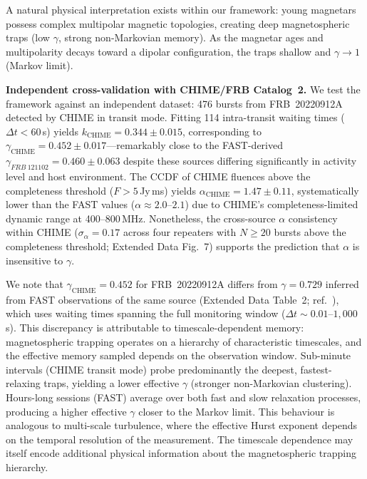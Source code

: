 \documentclass[twocolumn]{article}
\newcommand{\frb}[1]{FRB~#1}
\begin{document}
A natural physical interpretation exists within our framework: young magnetars possess complex multipolar magnetic topologies, creating deep magnetospheric traps (low $\gamma$, strong non-Markovian memory). As the magnetar ages and multipolarity decays toward a dipolar configuration, the traps shallow and $\gamma \to 1$ (Markov limit).

\textbf{Independent cross-validation with CHIME/FRB Catalog~2.} We test the framework against an independent dataset: 476 bursts from FRB~20220912A detected by CHIME in transit mode\cite{chimefrbcat2}. Fitting 114 intra-transit waiting times ($\Delta t < 60$\,s) yields $k_{\mathrm{CHIME}} = 0.344 \pm 0.015$, corresponding to $\gamma_{\mathrm{CHIME}} = 0.452 \pm 0.017$---remarkably close to the FAST-derived $\gamma_{\frb{121102}} = 0.460 \pm 0.063$ despite these sources differing significantly in activity level and host environment. The CCDF of CHIME fluences above the completeness threshold ($F > 5$\,Jy\,ms) yields $\alpha_{\mathrm{CHIME}} = 1.47 \pm 0.11$, systematically lower than the FAST values ($\alpha \approx 2.0$--$2.1$) due to CHIME's completeness-limited dynamic range at 400--800\,MHz. Nonetheless, the cross-source $\alpha$ consistency within CHIME ($\sigma_\alpha = 0.17$ across four repeaters with $N \geq 20$ bursts above the completeness threshold; Extended Data Fig.~7) supports the prediction that $\alpha$ is insensitive to $\gamma$.

We note that $\gamma_{\mathrm{CHIME}} = 0.452$ for FRB~20220912A differs from $\gamma = 0.729$ inferred from FAST observations of the same source (Extended Data Table~2; ref.~\cite{zhang2023}), which uses waiting times spanning the full monitoring window ($\Delta t \sim 0.01$--$1{,}000$\,s). This discrepancy is attributable to timescale-dependent memory: magnetospheric trapping operates on a hierarchy of characteristic timescales, and the effective memory sampled depends on the observation window. Sub-minute intervals (CHIME transit mode) probe predominantly the deepest, fastest-relaxing traps, yielding a lower effective $\gamma$ (stronger non-Markovian clustering). Hours-long sessions (FAST) average over both fast and slow relaxation processes, producing a higher effective $\gamma$ closer to the Markov limit. This behaviour is analogous to multi-scale turbulence, where the effective Hurst exponent depends on the temporal resolution of the measurement. The timescale dependence may itself encode additional physical information about the magnetospheric trapping hierarchy.
\end{document}
